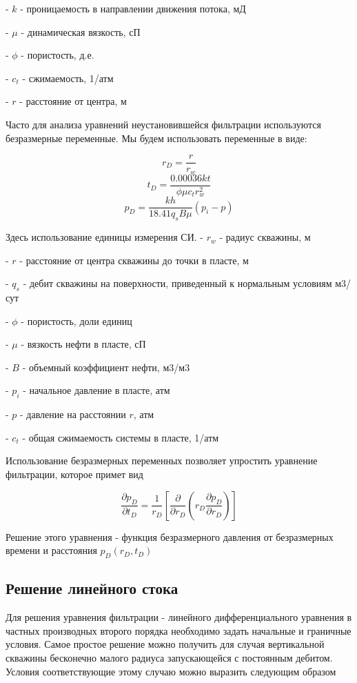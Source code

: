 \documentclass[oneside, openany]{memoir}
\begin{document}
	- $k$ - проницаемость в направлении движения потока, мД
	
	- $\mu$ - динамическая вязкость, сП
	
	- $\phi$ - пористость, д.е.
	
	- $c_t$ - сжимаемость, 1/атм
	
	- $r$ - расстояние от центра, м
	
	Часто для анализа уравнений неустановившейся фильтрации используются безразмерные переменные. Мы будем использовать переменные в виде:
	
	$$ r_D = \frac{r}{r_w}  $$
	$$ t_D = \frac{0.00036 kt}{\phi \mu c_t r_w^2}  $$
	$$ p_D = \frac{kh}{ 18.41 q_s B \mu} \left( p_i - p \right)   $$
	
	Здесь использование единицы измерения СИ.
	- $r_w$ - радиус скважины, м
	
	- $r$ - расстояние от центра скважины до точки в пласте, м
	
	- $q_s$ - дебит скважины на поверхности, приведенный к нормальным условиям м3/сут
	
	- $\phi$ - пористость, доли единиц
	
	- $\mu$ - вязкость нефти в пласте, сП
	
	- $B$ - объемный коэффициент нефти, м3/м3
	
	- $p_i$ - начальное давление в пласте, атм
	
	- $p$ - давление на расстоянии $r$, атм
	
	- $c_t$ - общая сжимаемость системы в пласте, 1/атм
	
	Использование безразмерных переменных позволяет упростить уравнение фильтрации, которое примет вид
	
	$$ 
	\frac{\partial p_D}{ \partial t_D} = \dfrac{1}{r_D} \left[ \dfrac{\partial}{\partial r_D} \left( r_D \dfrac{ \partial p_D} {\partial r_D} \right) \right] 
	$$
	
	Решение этого уравнения - функция безразмерного давления от безразмерных времени и расстояния $p_D(r_D, t_D) $
	
	\subsection{Решение линейного стока} 
	
	Для решения уравнения фильтрации - линейного дифференциального уравнения в частных производных второго порядка необходимо задать начальные и граничные условия.
	Самое простое решение можно получить для случая вертикальной скважины бесконечно малого радиуса запускающейся с постоянным дебитом. Условия соответствующие этому случаю можно выразить следующим образом
	
\end{document}
